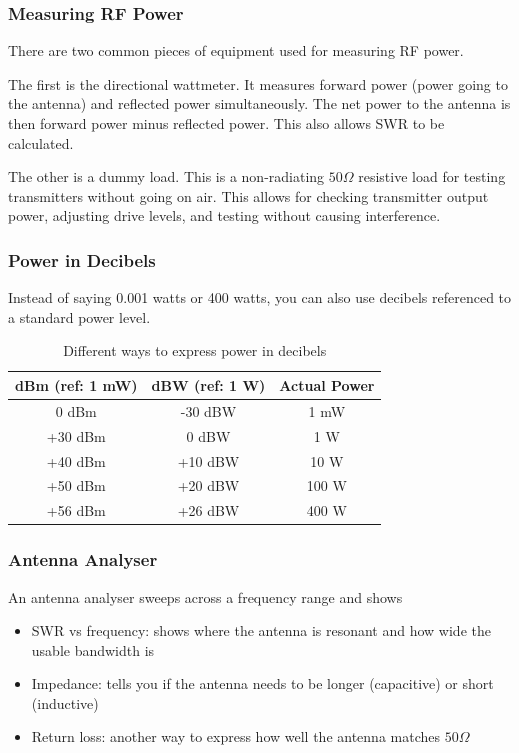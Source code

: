 \documentclass{article}
\begin{document}
\subsubsection{Measuring RF Power}
There are two common pieces of equipment used for measuring RF power.

The first is the directional wattmeter. It measures forward power (power going to the antenna) and reflected power simultaneously. The net power to the antenna is then forward power minus reflected power. This also allows SWR to be calculated.

The other is a dummy load. This is a non-radiating $50\Omega $ resistive load for testing transmitters without going on air. This allows for checking transmitter output power, adjusting drive levels, and testing without causing interference.

\subsubsection{Power in Decibels}
Instead of saying 0.001 watts or 400 watts, you can also use decibels referenced to a standard power level.

\begin{table}[h]
    \centering
    \caption{Different ways to express power in decibels}
    \label{tab:9}
    \begin{tabular}{c|c|c}
        dBm (ref: 1 mW) & dBW (ref: 1 W) & Actual Power \\
        \hline
        \hline
        0 dBm & -30 dBW & 1 mW \\
        +30 dBm & 0 dBW & 1 W \\
        +40 dBm & +10 dBW & 10 W \\
        +50 dBm & +20 dBW & 100 W \\
        +56 dBm & +26 dBW & 400 W
    \end{tabular}
\end{table}

\subsubsection{Antenna Analyser}
An antenna analyser sweeps across a frequency range and shows
\begin{itemize}
    \item SWR vs frequency: shows where the antenna is resonant and how wide the usable bandwidth is
    \item Impedance: tells you if the antenna needs to be longer (capacitive) or short (inductive)
    \item Return loss: another way to express how well the antenna matches $50\Omega $
\end{itemize}
\end{document}
